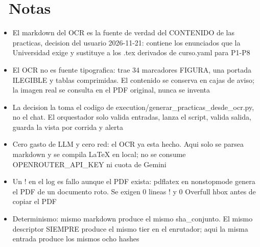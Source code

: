 \documentclass[11pt,a4paper]{article}
\newcommand{\iconotexto}[2]{\textcolor{cyanNeon}{\faIcon{#1}}~#2}
\begin{document}
\section{\iconotexto{sticky-note}{Notas}}
\begin{itemize}
\item El markdown del OCR es la fuente de verdad del CONTENIDO de las practicas, decision del usuario 2026-11-21: contiene los enunciados que la Universidad exige y sustituye a los .tex derivados de curso.yaml para P1-P8
\item El OCR no es fuente tipografica: trae 34 marcadores FIGURA, una portada ILEGIBLE y tablas comprimidas. El contenido se conserva en cajas de aviso; la imagen real se consulta en el PDF original, nunca se inventa
\item La decision la toma el codigo de execution/generar\_practicas\_desde\_ocr.py, no el chat. El orquestador solo valida entradas, lanza el script, valida salida, guarda la vista por corrida y alerta
\item Cero gasto de LLM y cero red: el OCR ya esta hecho. Aqui solo se parsea markdown y se compila LaTeX en local; no se consume OPENROUTER\_API\_KEY ni cuota de Gemini
\item Un ! en el log es fallo aunque el PDF exista: pdflatex en nonstopmode genera el PDF de un documento roto. Se exigen 0 lineas ! y 0 Overfull hbox antes de copiar el PDF
\item Determinismo: mismo markdown produce el mismo sha\_conjunto. El mismo descriptor SIEMPRE produce el mismo tier en el enrutador; aqui la misma entrada produce los mismos ocho hashes
\end{itemize}

\end{document}

